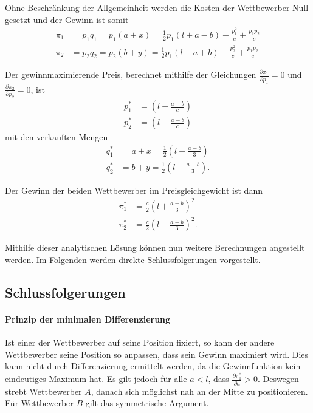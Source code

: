 Ohne Beschränkung der Allgemeinheit werden die Kosten der Wettbewerber Null gesetzt und der Gewinn ist somit \citep[S.\,46]{hotelling1929}
\begin{equation}
\begin{split}
\pi_1 &= p_1 q_1 = p_1 (a+x) = \tfrac{1}{2} p_1 \left(l+a-b\right) -\frac{p_1^2}{c}+\frac{p_1 p_2}{c}\\
\pi_2 &= p_2 q_2 = p_2 (b+y) = \tfrac{1}{2} p_1 \left(l-a+b\right) -\frac{p_2^2}{c}+\frac{p_1 p_2}{c}
\end{split}
\end{equation}

Der gewinnmaximierende Preis, berechnet mithilfe der Gleichungen $\frac{\partial \pi_1}{\partial p_1}=0$ und $\frac{\partial \pi_2}{\partial p_2}=0$, ist \citep[S.\,46]{hotelling1929}
\begin{equation}
\begin{split}
p_1^* &= \left(l+\frac{a-b}{c}\right) \\
p_2^* &= \left(l-\frac{a-b}{c}\right)
\end{split}
\end{equation}
mit den verkauften Mengen
\begin{equation}
\begin{split}
q_1^* &= a + x = \tfrac{1}{2} \left(l + \frac{a-b}{3}\right) \\
q_2^* &= b + y = \tfrac{1}{2} \left(l - \frac{a-b}{3}\right)
.\end{split}
\end{equation}

Der Gewinn der beiden Wettbewerber im Preisgleichgewicht ist dann \citep[S.\,50]{hotelling1929}
\begin{equation}\label{eqn:Gewinnfunktion}
\begin{split}
\pi_1^* &= \frac{c}{2} \left(l+\frac{a-b}{3}\right)^2 \\
\pi_2^* &= \frac{c}{2} \left(l-\frac{a-b}{3}\right)^2
.\end{split}
\end{equation}

Mithilfe dieser analytischen Lösung können nun weitere Berechnungen angestellt werden.
Im Folgenden werden direkte Schlussfolgerungen vorgestellt.

\subsection{Schlussfolgerungen}
\paragraph{Prinzip der minimalen Differenzierung}
Ist einer der Wettbewerber auf seine Position fixiert, so kann der andere Wettbewerber seine Position so anpassen, dass sein Gewinn maximiert wird.
Dies kann nicht durch Differenzierung ermittelt werden, da die Gewinnfunktion kein eindeutiges Maximum hat.
Es gilt jedoch für alle $a<l$, dass $\frac{\partial \pi_1^*}{\partial a} > 0$. Deswegen strebt Wettbewerber $A$, danach sich möglichst nah an der Mitte zu positionieren.
Für Wettbewerber $B$ gilt das symmetrische Argument. \citep[S.\,51-52]{hotelling1929}


